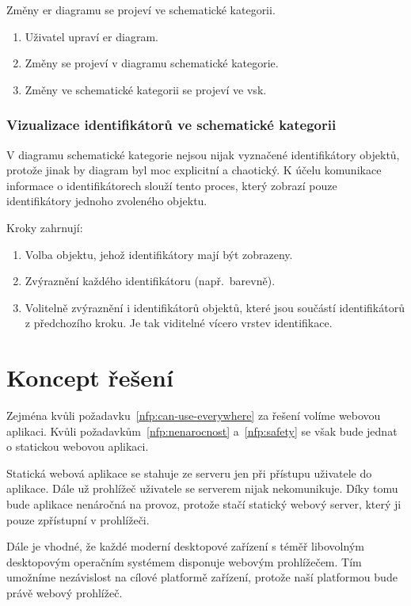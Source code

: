 Změny \acrshort{er} diagramu se projeví ve schematické kategorii.

\begin{enumerate}
  \item Uživatel upraví \acrshort{er} diagram.
  \item Změny se projeví v diagramu schematické kategorie.
  \item Změny ve schematické kategorii se projeví ve \acrshort{vsk}.
\end{enumerate}

\subsubsection*{Vizualizace identifikátorů ve schematické kategorii}
V diagramu schematické kategorie nejsou nijak vyznačené identifikátory objektů, protože jinak by diagram byl moc explicitní a chaotický.
K účelu komunikace informace o identifikátorech slouží tento proces, který zobrazí pouze identifikátory jednoho zvoleného objektu.

Kroky zahrnují:
\begin{enumerate}
  \item Volba objektu, jehož identifikátory mají být zobrazeny.
  \item Zvýraznění každého identifikátoru (např.~barevně).
  \item Volitelně zvýraznění i identifikátorů objektů, které jsou součástí identifikátorů z předchozího kroku.
        Je tak viditelné vícero vrstev identifikace.
\end{enumerate}

\section{Koncept řešení}

Zejména kvůli požadavku~\ref{nfp:can-use-everywhere} za řešení volíme webovou aplikaci.
Kvůli požadavkům~\ref{nfp:nenarocnost} a~\ref{nfp:safety} se však bude jednat o statickou webovou aplikaci.

Statická webová aplikace se stahuje ze serveru jen při přístupu uživatele do aplikace.
Dále už prohlížeč uživatele se serverem nijak nekomunikuje.
Díky tomu bude aplikace nenáročná na provoz, protože stačí statický webový server, který ji pouze zpřístupní v prohlížeči.

Dále je vhodné, že každé moderní desktopové zařízení s téměř libovolným desktopovým operačním systémem disponuje webovým prohlížečem.
Tím umožníme nezávislost na cílové platformě zařízení, protože naší platformou bude právě webový prohlížeč.

